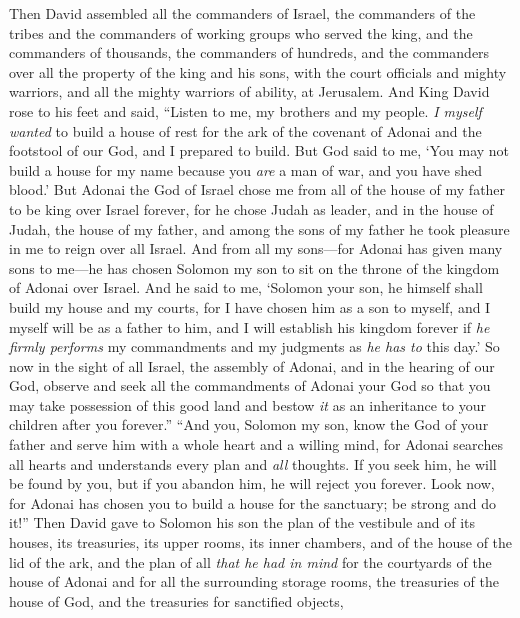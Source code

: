 \begin{biblechapter} %
 Then David assembled all the commanders of Israel, the commanders of the tribes and the commanders of working groups who served the king, and the commanders of thousands, the commanders of hundreds, and the commanders over all the property of the king and his sons, with the court officials and mighty warriors, and all the mighty warriors of ability, at Jerusalem.
\verse And King David rose to his feet and said, “Listen to me, my brothers and my people. \textit{I myself wanted} to build a house of rest for the ark of the covenant of Adonai and the footstool of our God, and I prepared to build.
\verse But God said to me, ‘You may not build a house for my name because you \textit{are} a man of war, and you have shed blood.’
\verse But Adonai the God of Israel chose me from all of the house of my father to be king over Israel forever, for he chose Judah as leader, and in the house of Judah, the house of my father, and among the sons of my father he took pleasure in me to reign over all Israel.
\verse And from all my sons—for Adonai has given many sons to me—he has chosen Solomon my son to sit on the throne of the kingdom of Adonai over Israel.
\verse And he said to me, ‘Solomon your son, he himself shall build my house and my courts, for I have chosen him as a son to myself, and I myself will be as a father to him,
\verse and I will establish his kingdom forever if \textit{he firmly performs} my commandments and my judgments as \textit{he has to} this day.’
\verse So now in the sight of all Israel, the assembly of Adonai, and in the hearing of our God, observe and seek all the commandments of Adonai your God so that you may take possession of this good land and bestow \textit{it} as an inheritance to your children after you forever.”
 “And you, Solomon my son, know the God of your father and serve him with a whole heart and a willing mind, for Adonai searches all hearts and understands every plan and \textit{all} thoughts. If you seek him, he will be found by you, but if you abandon him, he will reject you forever.
\verse Look now, for Adonai has chosen you to build a house for the sanctuary; be strong and do it!”
\verse Then David gave to Solomon his son the plan of the vestibule and of its houses, its treasuries, its upper rooms, its inner chambers, and of the house of the lid of the ark,
\verse and the plan of all \textit{that he had in mind} for the courtyards of the house of Adonai and for all the surrounding storage rooms, the treasuries of the house of God, and the treasuries for sanctified objects,

\end{biblechapter}
